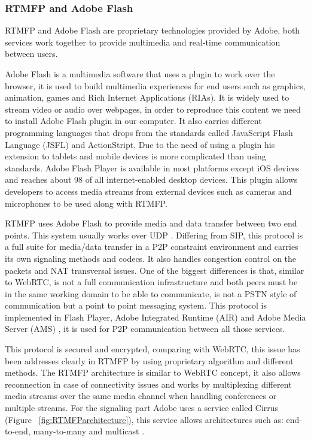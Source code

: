\subsubsection{RTMFP and Adobe Flash}

RTMFP and Adobe Flash are proprietary technologies provided by Adobe, both services work together to provide multimedia and real-time communication between users.

Adobe Flash is a multimedia software that uses a plugin to work over the browser, it is used to build multimedia experiences for end users such as graphics, animation, games and Rich Internet Applications (RIAs). It is widely used to stream video or audio over webpages, in order to reproduce this content we need to install Adobe Flash plugin in our computer. It also carries different programming languages that drops from the standards called JavaScript Flash Language (JSFL) and ActionStript. Due to the need of using a plugin his extension to tablets and mobile devices is more complicated than using standards. Adobe Flash Player is available in most platforms except iOS devices and reaches about 98 of all internet-enabled desktop devices. This plugin allows developers to access media streams from external devices such as cameras and microphones to be used along with RTMFP.

RTMFP uses Adobe Flash to provide media and data transfer between two end points. This system usually works over UDP \cite{rtmfpSIP}. Differing from SIP, this protocol is a full suite for media/data transfer in a P2P constraint environment and carries its own signaling methods and codecs. It also handles congestion control on the packets and NAT transversal issues. One of the biggest differences is that, similar to WebRTC, is not a full communication infrastructure and both peers must be in the same working domain to be able to communicate, is not a PSTN style of communication but a point to point messaging system. This protocol is implemented in Flash Player, Adobe Integrated Runtime (AIR) and Adobe Media Server (AMS)  \cite{rtmfpSIP}, it is used for P2P communication between all those services. 

This protocol is secured and encrypted, comparing with WebRTC, this issue has been addresses clearly in RTMFP by using proprietary algorithm and different methods. The RTMFP architecture is similar to WebRTC concept, it also allows reconnection in case of connectivity issues and works by multiplexing different media streams over the same media channel when handling conferences or multiple streams. For the signaling part Adobe uses a service called Cirrus (Figure ~\ref{fig:RTMFParchitecture}), this service allows architectures such as: end-to-end, many-to-many and multicast \cite{cirrusFAQ}.
 
